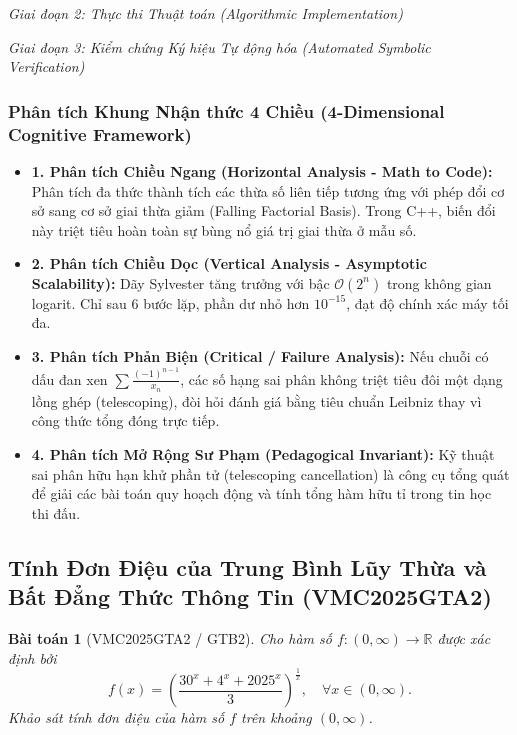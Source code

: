 \documentclass{article}
\newtheorem{baitoan}{Bài toán}
\begin{document}
\vspace{0.5em}\noindent\emph{Giai đoạn 2: Thực thi Thuật toán (Algorithmic Implementation)}


\vspace{0.5em}\noindent\emph{Giai đoạn 3: Kiểm chứng Ký hiệu Tự động hóa (Automated Symbolic Verification)}


\subsubsection*{Phân tích Khung Nhận thức 4 Chiều (4-Dimensional Cognitive Framework)}
\begin{itemize}
    \item \textbf{1. Phân tích Chiều Ngang (Horizontal Analysis - Math to Code):} Phân tích đa thức thành tích các thừa số liên tiếp tương ứng với phép đổi cơ sở sang cơ sở giai thừa giảm (Falling Factorial Basis). Trong C++, biến đổi này triệt tiêu hoàn toàn sự bùng nổ giá trị giai thừa ở mẫu số.
    \item \textbf{2. Phân tích Chiều Dọc (Vertical Analysis - Asymptotic Scalability):} Dãy Sylvester tăng trưởng với bậc $\mathcal{O}(2^n)$ trong không gian logarit. Chỉ sau 6 bước lặp, phần dư nhỏ hơn $10^{-15}$, đạt độ chính xác máy tối đa.
    \item \textbf{3. Phân tích Phản Biện (Critical / Failure Analysis):} Nếu chuỗi có dấu đan xen $\sum \frac{(-1)^{n-1}}{x_n}$, các số hạng sai phân không triệt tiêu đôi một dạng lồng ghép (telescoping), đòi hỏi đánh giá bằng tiêu chuẩn Leibniz thay vì công thức tổng đóng trực tiếp.
    \item \textbf{4. Phân tích Mở Rộng Sư Phạm (Pedagogical Invariant):} Kỹ thuật sai phân hữu hạn khử phần tử (telescoping cancellation) là công cụ tổng quát để giải các bài toán quy hoạch động và tính tổng hàm hữu tỉ trong tin học thi đấu.
\end{itemize}

\subsection{Tính Đơn Điệu của Trung Bình Lũy Thừa và Bất Đẳng Thức Thông Tin (VMC2025GTA2)}

\begin{baitoan}[VMC2025GTA2 / GTB2]
Cho hàm số $f: (0, \infty) \to \mathbb{R}$ được xác định bởi
\begin{equation}
    f(x) = \left(\frac{30^x + 4^x + 2025^x}{3}\right)^{\frac{1}{x}}, \quad \forall x \in (0, \infty).
\end{equation}
Khảo sát tính đơn điệu của hàm số $f$ trên khoảng $(0, \infty)$.
\end{baitoan}
\end{document}
